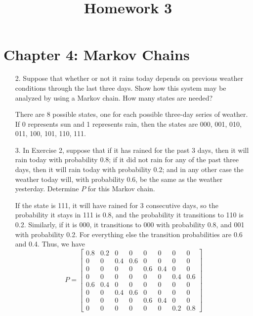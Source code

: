 \documentclass{article}
\begin{document}
\title{Homework 3}
\maketitle
\thispagestyle{fancy}

\section*{Chapter 4: Markov Chains}

\begin{itemize}
	\item[2.] Suppose that whether or not it rains today depends on previous weather conditions through the last three days. Show how this system may be analyzed by using a Markov chain. How many states are needed?
		\begin{soln}
			There are 8 possible states, one for each possible three-day series of weather. If 0 represents sun and 1 represents rain, then the states are 000, 001, 010, 011, 100, 101, 110, 111. 
		\end{soln}

	\item[3.] In Exercise 2, suppose that if it has rained for the past 3 days, then it will rain today with probability 0.8; if it did not rain for any of the past three days, then it will rain today with probability 0.2; and in any other case the weather today will, with probability 0.6, be the same as the weather yesterday. Determine $P$ for this Markov chain.
		\begin{soln}
			If the state is 111, it will have rained for 3 consecutive days, so the probability it stays in 111 is 0.8, and the probability it transitions to 110 is 0.2. Similarly, if it is 000, it transitions to 000 with probability 0.8, and 001 with probability 0.2. For everything else the transition probabilities are 0.6 and 0.4. Thus, we have
			\[P=\begin{bmatrix}
					0.8 & 0.2 & 0 & 0 & 0 & 0 & 0 & 0 \\
					0 & 0 & 0.4 & 0.6 & 0 & 0 & 0 & 0 \\
					0 & 0 & 0 & 0 & 0.6 & 0.4 & 0 & 0 \\
					0 & 0 & 0 & 0 & 0 & 0 & 0.4 & 0.6 \\
					0.6 & 0.4 & 0 & 0 & 0 & 0 & 0 & 0 \\
					0 & 0 & 0.4 & 0.6 & 0 & 0 & 0 & 0 \\
					0 & 0 & 0 & 0 & 0.6 & 0.4 & 0 & 0 \\
					0 & 0 & 0 & 0 & 0 & 0 & 0.2 & 0.8
			\end{bmatrix}\]
		\end{soln}


\end{itemize}
\end{document}
